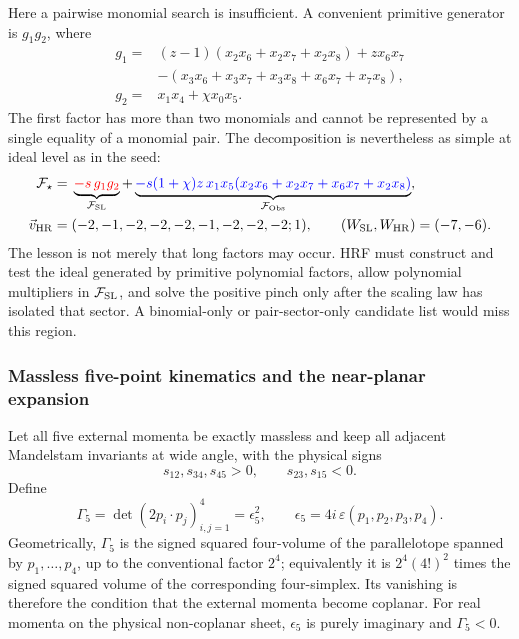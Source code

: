 \documentclass[a4paper,11pt]{article}
\newcommand{\FSL}{\mathcal F_{\rm SL}}
\newcommand{\FObs}{\mathcal F_{\rm Obs}}
\newcommand{\WSL}{W_{\rm SL}}
\newcommand{\WHR}{W_{\rm HR}}
\newcommand{\vHR}{\vec v_{\rm HR}}
\newcommand{\SLcolour}[1]{{\color{red}#1}}
\newcommand{\HRcolour}[1]{{\color{blue}#1}}
\begin{document}
Here a pairwise monomial search is insufficient.  A convenient primitive
generator is \(g_1g_2\), where
\begin{align}
 g_1={}&(z-1)(x_2x_6+x_2x_7+x_2x_8)+zx_6x_7
 \nonumber\\[-1mm]
 &-(x_3x_6+x_3x_7+x_3x_8+x_6x_7+x_7x_8),
 \nonumber\\
 g_2={}&x_1x_4+\chi x_0x_5.
 \label{eq:five-vertex-factors}
\end{align}
The first factor has more than two monomials and cannot be represented by a
single equality of a monomial pair.  The decomposition is nevertheless as
simple at ideal level as in the seed:
\begin{align}
 \mathcal F_\star={}&
 \underbrace{\SLcolour{-s\,g_1g_2}}_{\FSL}
 +\underbrace{\HRcolour{-s(1+\chi)z\,x_1x_5
 (x_2x_6+x_2x_7+x_6x_7+x_2x_8)}}_{\FObs},
 \label{eq:five-vertex-decomposition}\\
 \vHR={}&(-2,-1,-2,-2,-2,-1,-2,-2,-2;1),
 \qquad (\WSL,\WHR)=(-7,-6).
 \label{eq:five-vertex-vector}
\end{align}
The lesson is not merely that long factors may occur.  HRF must construct
and test the ideal generated by primitive polynomial factors, allow
polynomial multipliers in \(\FSL\), and solve the positive pinch only after
the scaling law has isolated that sector.  A binomial-only or
pair-sector-only candidate list would miss this region.

\subsubsection{Massless five-point kinematics and the near-planar expansion}
\label{sec:five-point-near-planar}

Let all five external momenta be exactly massless and keep all adjacent
Mandelstam invariants at wide angle, with the physical signs
\begin{equation}
 s_{12},s_{34},s_{45}>0,\qquad s_{23},s_{15}<0.
 \label{eq:five-wide-angle-signs}
\end{equation}
Define
\begin{equation}
 \Gamma_5=\det(2p_i\!\cdot p_j)_{i,j=1}^{4}=\epsilon_5^2,
 \qquad \epsilon_5=4i\,\varepsilon(p_1,p_2,p_3,p_4).
 \label{eq:five-gram-definition}
\end{equation}
Geometrically, \(\Gamma_5\) is the signed squared four-volume of the
parallelotope spanned by \(p_1,\ldots,p_4\), up to the conventional factor
\(2^4\); equivalently it is \(2^4(4!)^2\) times the signed squared volume of
the corresponding four-simplex.  Its vanishing is therefore the condition
that the external momenta become coplanar.  For real momenta on the physical
non-coplanar sheet, \(\epsilon_5\) is purely imaginary and \(\Gamma_5<0\).
\end{document}
